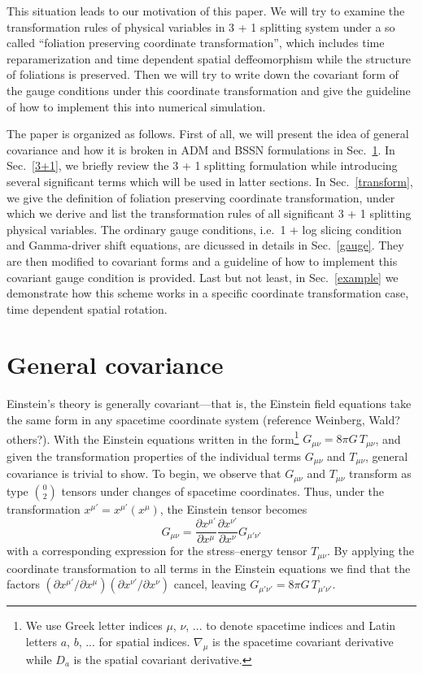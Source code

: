 \documentclass[letterpaper,nofootinbib,prd,amsmath,onecolumn]{revtex4-1}
\begin{document}
This situation leads to our motivation of this paper. We will try to examine the transformation rules of physical variables in 3 + 1 splitting system under a so called ``foliation preserving coordinate transformation'', which includes time reparamerization and time dependent spatial deffeomorphism while the structure of foliations is preserved. Then we will try to write down the covariant form of the gauge conditions under this coordinate transformation and give the guideline of how to implement this into numerical simulation. 

The paper is organized as follows. First of all, we will present the idea of general covariance and how it is broken in ADM and BSSN formulations in Sec.~\ref{covariance}. In Sec.~\ref{3+1}, we briefly review the 3 + 1 splitting formulation while introducing several significant terms which will be used in latter sections. In Sec.~\ref{transform}, we give the definition of foliation preserving coordinate transformation, under which we derive and list the transformation rules of all significant 3 + 1 splitting physical variables. The ordinary gauge conditions, i.e.~1 + log slicing condition and Gamma-driver shift equations, are dicussed in details in Sec.~\ref{gauge}. They are then modified to covariant forms and a guideline of how to implement this covariant gauge condition is provided. Last but not least, in Sec.~\ref{example} we demonstrate how this scheme works in a specific coordinate transformation case, time dependent spatial rotation.
\section{General covariance}\label{covariance}
Einstein's theory is generally covariant---that is, the Einstein field equations take the same 
form in any spacetime coordinate system ({\color{red}reference Weinberg, Wald? others?}). With the 
Einstein equations written in the form\footnote{We use Greek letter indices $\mu$, $\nu$, ... to denote spacetime indices and Latin 
letters $a$, $b$, ... for spatial indices. $\nabla_{\mu}$ is the spacetime covariant derivative while $D_{a}$ is the spatial 
covariant derivative.} $G_{\mu\nu} = 8\pi G\, T_{\mu\nu}$, and given the transformation properties 
of the individual terms $G_{\mu\nu}$ and $T_{\mu\nu}$, general covariance is trivial to show. To begin, we observe that 
$G_{\mu\nu}$ and $T_{\mu\nu}$ transform as type $0\choose 2$ tensors under changes of spacetime coordinates. Thus, under the  
transformation $x^{\mu'} = x^{\mu'}(x^\mu)$, the Einstein tensor becomes
\begin{equation}
	G_{\mu\nu} = \frac{\partial x^{\mu'}}{\partial x^{\mu}} \frac{\partial x^{\nu'}}{\partial x^{\nu}} G_{\mu'\nu'} 
\end{equation}
with a corresponding expression for the stress--energy tensor $T_{\mu\nu}$. By applying the coordinate transformation 
to all terms in the Einstein equations we find that the factors 
$(\partial x^{\mu'}/\partial x^{\mu}) (\partial x^{\nu'}/\partial x^{\nu})$
cancel, leaving $G_{\mu'\nu'} = 8\pi G\, T_{\mu'\nu'}$. 
\end{document}
